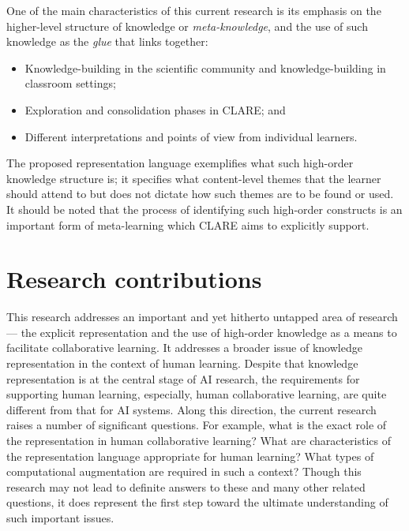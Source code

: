 One of the main characteristics of this current research is its emphasis on
the higher-level structure of knowledge or {\it meta-knowledge\/}, and the
use of such knowledge as the {\it glue\/} that links together:

\begin{itemize}
\item Knowledge-building in the scientific community and
  knowledge-building in classroom settings;
  
\item Exploration and consolidation phases in CLARE; and
  
\item Different interpretations and points of view from individual
  learners.
\end{itemize}

The proposed representation language exemplifies what such high-order
knowledge structure is; it specifies what content-level themes that the
learner should attend to but does not dictate how such themes are to be
found or used. It should be noted that the process of identifying such
high-order constructs is an important form of meta-learning which CLARE
aims to explicitly support.


\section{Research contributions}
\label{sec:contributions}

This research addresses an important and yet hitherto untapped area of
research --- the explicit representation and the use of high-order
knowledge as a means to facilitate collaborative learning. It addresses a
broader issue of knowledge representation in the context of human learning.
Despite that knowledge representation is at the central stage of AI
research, the requirements for supporting human learning, especially, human
collaborative learning, are quite different from that for AI systems. Along
this direction, the current research raises a number of significant
questions. For example, what is the exact role of the representation in
human collaborative learning?  What are characteristics of the
representation language appropriate for human learning? What types of
computational augmentation are required in such a context? Though this
research may not lead to definite answers to these and many other related
questions, it does represent the first step toward the ultimate
understanding of such important issues.

